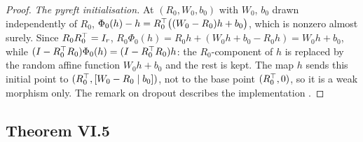 \begin{proof}
\emph{The pyreft initialisation.} At $(R_0,W_0,b_0)$ with $W_0$, $b_0$ drawn independently of $R_0$, $\Phi_0(h)-h=R_0^{\top}\big((W_0-R_0)
h+b_0\big)$, which is nonzero almost surely. Since $R_0R_0^{\top}=I_r$, $R_0\Phi_0(h)=R_0h+(W_0h+b_0-R_0h)=W_0h+b_0$, while
$(I-R_0^{\top} R_0)\Phi_0(h)=(I-R_0^{\top} R_0)h$: the $R_0$-component of $h$ is replaced by the random affine function $W_0h+b_0$ and the
rest is kept. The map $h$ sends this initial point to $(R_0^{\top},[W_0-R_0\mid b_0])$, not to the base point $(R_0^{\top},0)$, so it is a
weak morphism only. The remark on dropout describes the implementation \citep{wu2024reft}.
\end{proof}

\subsection{Theorem VI.5}\label{proof:VI.5}

